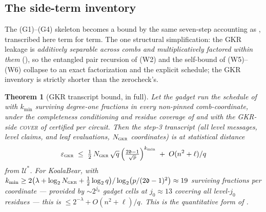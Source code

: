 \documentclass{article}
\newcommand{\extdeg}{\mathfrak{d}}
\newtheorem{theorem}{Theorem}[section]
\theoremstyle{definition}
\begin{document}
\subsection{The side-term inventory}\label{sec:gkr-inventory}

The (G1)--(G4) skeleton becomes a bound by the same seven-step accounting as , transcribed here term for term. The one structural simplification: the GKR leakage is \emph{additively separable across combs and multiplicatively factored within them} (), so the entangled pair recursion of (W2) and the self-bound of (W5)--(W6) collapse to an exact factorization and the explicit schedule; the GKR inventory is strictly shorter than the zerocheck's.

\begin{theorem}[GKR transcript bound, in full]\label{thm:gkr}
Let the gadget run the schedule of  with $k_{\min}$ surviving degree-one fractions in every non-pinned comb-coordinate, under the completeness conditioning and residue coverage of  and with the GKR-side \textsc{cover} of  certified per circuit. Then the step-3 transcript (all level messages, level claims, and leaf evaluations, $N_{\textsc{gkr}}$ coordinates) is at statistical distance
\[
\varepsilon_{\textsc{gkr}} \;\leq\; \tfrac12\, N_{\textsc{gkr}}\,\sqrt{q}\,\Big(\tfrac{2\extdeg-1}{\sqrt p}\Big)^{k_{\min}} \;+\; O(n^2 + \ell)/q
\]
from $\mathcal{U}^*$. For KoalaBear, with $k_{\min} \geq 2\big(\lambda + \log_2 N_{\textsc{gkr}} + \tfrac12\log_2 q\big)/\log_2\!\big(p/(2\extdeg-1)^2\big) \approx 19$ surviving fractions per coordinate --- provided by $\sim 2^{j_0}$ gadget cells at $j_0 \approx 13$ covering all level-$j_0$ residues --- this is $\leq 2^{-\lambda} + O(n^2+\ell)/q$. This is the quantitative form of .
\end{theorem}
\end{document}

